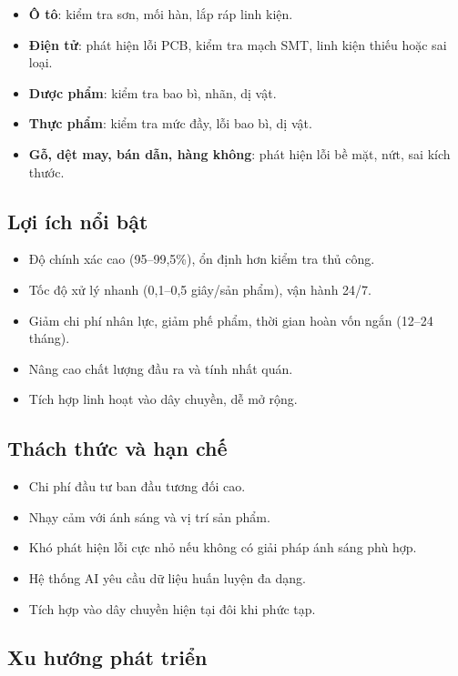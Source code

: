 \begin{itemize}
    \item \textbf{Ô tô}: kiểm tra sơn, mối hàn, lắp ráp linh kiện.
    \item \textbf{Điện tử}: phát hiện lỗi PCB, kiểm tra mạch SMT, linh kiện thiếu hoặc sai loại.
    \item \textbf{Dược phẩm}: kiểm tra bao bì, nhãn, dị vật.
    \item \textbf{Thực phẩm}: kiểm tra mức đầy, lỗi bao bì, dị vật.
    \item \textbf{Gỗ, dệt may, bán dẫn, hàng không}: phát hiện lỗi bề mặt, nứt, sai kích thước.
\end{itemize}

\subsection*{Lợi ích nổi bật}

\begin{itemize}
    \item Độ chính xác cao (95--99,5\%), ổn định hơn kiểm tra thủ công.
    \item Tốc độ xử lý nhanh (0,1–0,5 giây/sản phẩm), vận hành 24/7.
    \item Giảm chi phí nhân lực, giảm phế phẩm, thời gian hoàn vốn ngắn (12--24 tháng).
    \item Nâng cao chất lượng đầu ra và tính nhất quán.
    \item Tích hợp linh hoạt vào dây chuyền, dễ mở rộng.
\end{itemize}

\subsection*{Thách thức và hạn chế}

\begin{itemize}
    \item Chi phí đầu tư ban đầu tương đối cao.
    \item Nhạy cảm với ánh sáng và vị trí sản phẩm.
    \item Khó phát hiện lỗi cực nhỏ nếu không có giải pháp ánh sáng phù hợp.
    \item Hệ thống AI yêu cầu dữ liệu huấn luyện đa dạng.
    \item Tích hợp vào dây chuyền hiện tại đôi khi phức tạp.
\end{itemize}

\subsection*{Xu hướng phát triển}

